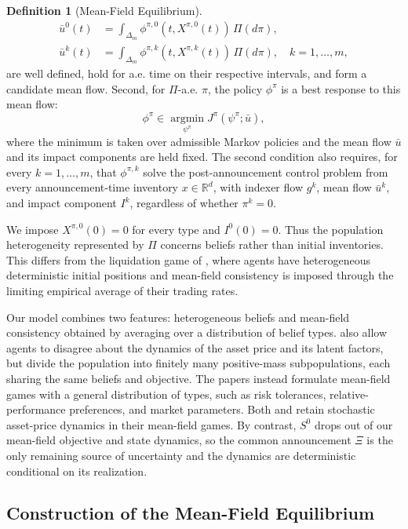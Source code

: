 \documentclass[12pt]{article}
\numberwithin{equation}{section}
\theoremstyle{definition}
\newtheorem{definition}[theorem]{Definition}
\begin{document}
\begin{definition}[Mean-Field Equilibrium]
\begin{equation}
\begin{aligned}
\bar u^0(t)
&=
\int_{\Delta_m}
\phi^{\pi,0}(t,X^{\pi,0}(t))\,\Pi(d\pi),
\\
\bar u^k(t)
&=
\int_{\Delta_m}
\phi^{\pi,k}(t,X^{\pi,k}(t))\,\Pi(d\pi),
\quad k=1,\ldots,m,
\end{aligned}
\end{equation}
are well defined, hold for a.e. time on their respective intervals, and form a
candidate mean flow. Second, for \(\Pi\)-a.e. \(\pi\), the policy
\(\phi^{\pi}\) is a best response to this mean flow:
\[
\phi^{\pi}
\in
\operatorname*{argmin}_{\psi^\pi}
J^\pi(\psi^\pi;\bar u),
\]
where the minimum is taken over admissible Markov policies and the mean flow
\(\bar u\) and its impact components are held fixed. The second condition also
requires, for every \(k=1,\ldots,m\), that \(\phi^{\pi,k}\) solve the
post-announcement control problem from every announcement-time inventory
\(x\in\mathbb R^d\), with indexer flow \(g^k\), mean flow \(\bar u^k\), and
impact component \(I^k\), regardless of whether \(\pi^k=0\).
\end{definition}

We impose \(X^{\pi,0}(0)=0\) for every type and \(I^0(0)=0\). Thus the
population heterogeneity represented by \(\Pi\) concerns beliefs rather than
initial inventories. This differs from the liquidation game of
\citet{NeumanVoss2023}, where agents have heterogeneous deterministic initial
positions and mean-field consistency is imposed through the limiting empirical
average of their trading rates.

Our model combines two features: heterogeneous beliefs and mean-field
consistency obtained by averaging over a distribution of belief types.
\citet{Casgrain2020} also allow agents to disagree about the dynamics of the
asset price and its latent factors, but divide the population into finitely
many positive-mass subpopulations, each sharing the same beliefs and objective.
The papers \citep{Lacker2019,Lacker2020} instead formulate
mean-field games with a general distribution of types, such as risk
tolerances, relative-performance preferences, and market parameters. Both
\citet{Casgrain2020} and \citet{Lacker2019,Lacker2020} retain stochastic
asset-price dynamics in their mean-field games. By contrast, \(S^0\) drops out
of our mean-field objective and state dynamics, so the common announcement
\(\Xi\) is the only remaining source of uncertainty and the dynamics are
deterministic conditional on its realization.


\subsection{Construction of the Mean-Field Equilibrium}
\end{document}
